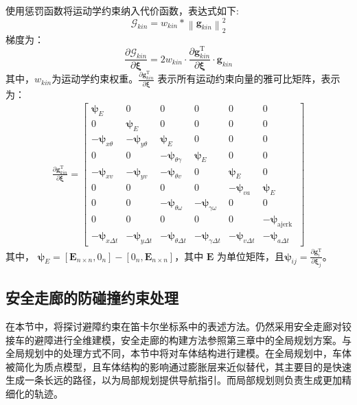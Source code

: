 \documentclass[master,academic]{ysuthesis} %
\begin{document}
		使用惩罚函数将运动学约束纳入代价函数，表达式如下:
		\begin{equation}
			\mathcal{G}_{kin} = w_{kin}*\left \| \bm{g}_{kin} \right \|_2^2 \label{Gkin}
		\end{equation}
		梯度为：
		\begin{equation}
			\frac{\partial\mathcal{G}_{kin}}{\partial\bm{\xi}}=2w_{kin}\cdot\frac{\partial \bm{g}_{kin}^{\mathrm{T}}}{\partial\bm{\xi}}\cdot \bm{g}_{kin}\label{18}
		\end{equation}
		其中，$w_{kin}$为运动学约束权重。\(\frac{\partial \bm{g}_{kin}^{\mathrm{T}}}{\partial \bm{\xi}}\) 表示所有运动约束向量的雅可比矩阵，表示为：
		\begin{equation}
			\begin{array}{c}
				\frac{\partial \bm{g}_{kin}^{\mathrm{T}}}{\partial \bm{\xi}}= 
				{\left[\begin{array}{cccccc}
						\bm{\psi}_{E} & 0 & 0 & 0 & 0 & 0 \\
						0 & \bm{\psi}_{E} & 0 & 0 & 0 & 0 \\
						-\bm{\psi}_{x \theta} & -\bm{\psi}_{y \theta} & \bm{\psi}_{E} & 0 & 0 & 0 \\
						0 & 0 & -\bm{\psi}_{\theta \gamma} & \bm{\psi}_{E} & 0 & 0 \\
						-\bm{\psi}_{x v} & -\bm{\psi}_{y v} & -\bm{\psi}_{\theta v} & 0 & \bm{\psi}_{E} & 0 \\
						0 & 0 & 0 & 0 & -\bm{\psi}_{v a} & \bm{\psi}_{E} \\
						0 & 0 & -\bm{\psi}_{\theta \omega} & -\bm{\psi}_{\gamma \omega} & 0 & 0 \\
						0 & 0 & 0 & 0 & 0 & -\bm{\psi}_{\text {ajerk }} \\
						-\bm{\psi}_{x \Delta t} & -\bm{\psi}_{y \Delta t} & -\bm{\psi}_{\theta \Delta t} & -\bm{\psi}_{\gamma \Delta t} & -\bm{\psi}_{v \Delta t} & -\bm{\psi}_{a \Delta t}
					\end{array}\right]}
			\end{array}
			\label{eq:运动学约束的雅可比}
		\end{equation}
		其中， $\bm{\psi}_E = [\bm{E}_{n \times n}, 0_n] - [0_n, \bm{E}_{n \times n}]$，其中 $\bm{E}$ 为单位矩阵，且\(\bm{\psi}_{ij} = \frac{\partial \bm{g}^{\mathrm{T}}_{i}}{\partial \bm{\xi}_j}\)。

		\subsection{安全走廊的防碰撞约束处理}
		在本节中，将探讨避障约束在笛卡尔坐标系中的表述方法。仍然采用安全走廊对铰接车的避障进行全维建模，安全走廊的构建方法参照第三章中的全局规划方案。与全局规划中的处理方式不同，本节中将对车体结构进行建模。在全局规划中，车体被简化为质点模型，且车体结构的影响通过膨胀层来近似替代，其主要目的是快速生成一条长远的路径，以为局部规划提供导航指引。而局部规划则负责生成更加精细化的轨迹。
\end{document}
